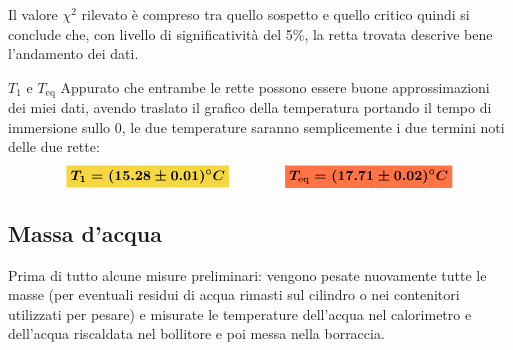 \documentclass{article}
\newcommand{\giallo}[1]{\colorbox{myyellow}{$\displaystyle #1$}}
\newcommand{\rosso}[1]{\colorbox{myred}{$\displaystyle #1$}}
\begin{document}
	\noindent
	Il valore \(\chi^2\) rilevato è compreso tra quello sospetto e quello critico quindi si conclude che, con livello di significatività del 5\%, la retta trovata descrive bene l'andamento dei  dati.
	
	
	\begin{es}{\(T_{1}\) e \(T_{\text{eq}}\)}
		Appurato che entrambe le rette possono essere buone approssimazioni dei miei dati, avendo traslato il grafico della temperatura portando il tempo di immersione sullo 0, le due temperature saranno semplicemente i due termini noti delle due rette:
		\[ 
		\giallo{\boldsymbol{T_{1} = (15.28	\pm 0.01)^\circ C}}\qquad \qquad \rosso{\boldsymbol{T_{\text{eq}} = (17.71	\pm 0.02)^\circ C}}
		\]
	\end{es}
	
	
	
	\subsection{Massa d'acqua}
	Prima di tutto alcune misure preliminari: vengono pesate nuovamente tutte le masse (per eventuali residui di acqua rimasti sul cilindro o nei contenitori utilizzati per pesare) e misurate le temperature dell'acqua nel calorimetro e dell'acqua riscaldata nel bollitore e poi messa nella borraccia.
	
\end{document}
